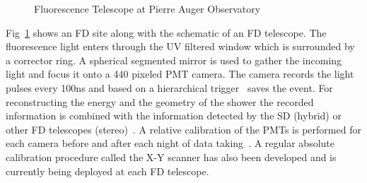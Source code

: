 \begin{figure}
  \centering
  \hfill
  \caption{Fluorescence Telescope at Pierre Auger Observatory}
  \label{fig:FD_sketch_schematic}
\end{figure}

Fig~\ref{fig:FD_sketch_schematic} shows an FD site along with the schematic of an FD telescope. The fluorescence light enters through the UV filtered window 
which is surrounded by a corrector ring. A spherical segmented mirror is used to gather the incoming light and focus it onto a 440 pixeled PMT camera. The camera records the light pulses every 100ns and based on a hierarchical trigger~\cite{Abraham_2010_FD} saves the event. For reconstructing the energy and the geometry of the shower the recorded information is combined with the information detected by the SD (hybrid) or other FD telescopes (stereo)~\cite{SALAMIDA2008207}. A relative calibration of the PMTs is performed for each camera before and after each night of data taking~\cite{Abraham_2010_FD}. A regular absolute calibration procedure called the X-Y scanner has also been developed and is currently being deployed at each FD telescope. 

